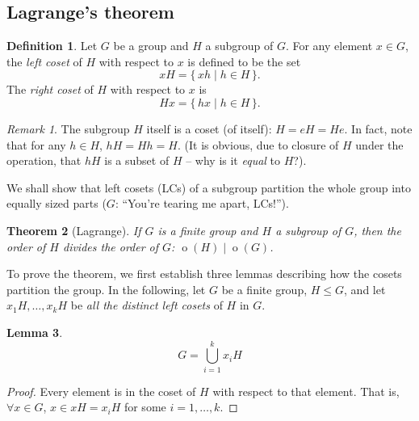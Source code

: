 \documentclass[svgnames]{article}
\newtheorem{Theorem}{Theorem}[section]
\newtheorem{Lemma}[Theorem]{Lemma}
\theoremstyle{definition}
\newtheorem{Definition}[Theorem]{Definition}
\theoremstyle{remark}
\newtheorem*{Remark*}{Remark}
\DeclareMathOperator{\ord}{o}
\begin{document}
\subsection{Lagrange's theorem}\label{subsec:Lagrange}
\begin{Definition}\label{def:Cosets}
Let $G$ be a group and $H$ a subgroup of $G$. For any element $x \in G$, the \emph{left coset} of $H$ with respect to $x$ is defined to be the set
\begin{equation*}
xH = \{\, xh \mid h \in H  \,\}.
\end{equation*}
The \emph{right coset} of $H$ with respect to $x$ is
\begin{equation*}
Hx = \{\, hx \mid h \in H \,\}.
\end{equation*}
\end{Definition}

\begin{Remark*}
The subgroup $H$ itself is a coset (of itself): $H = eH = He$. In fact, note that for any $h \in H$, $hH = Hh = H$. (It is obvious, due to closure of $H$ under the operation, that $hH$ is a subset of $H$ -- why is it \textit{equal} to $H$?).
\end{Remark*}

We shall show that left cosets (LCs) of a subgroup partition the whole group into equally sized parts ($G$: ``You're tearing me apart, LCs!'').

\begin{Theorem}[Lagrange]\label{thm:Lagrange}
If $G$ is a finite group and $H$ a subgroup of $G$, then the order of $H$ divides the order of $G$: $\ord(H) \mid \ord(G)$.
\end{Theorem}

To prove the theorem, we first establish three lemmas describing how the cosets partition the group. In the following, let $G$ be a finite group, $H \le G$, and let $x_1 H, \ldots, x_kH$ be \emph{all the distinct left cosets} of $H$ in $G$.

\begin{Lemma}\label{lem:CosetUnion}
\begin{equation*}
G = \bigcup_{i = 1}^k x_i H
\end{equation*}
\end{Lemma}
\begin{proof}
Every element is in the coset of $H$ with respect to that element. That is, $\forall x \in G$, $x \in xH = x_i H$ for some $i = 1, \ldots, k$.
\end{proof}
\end{document}

